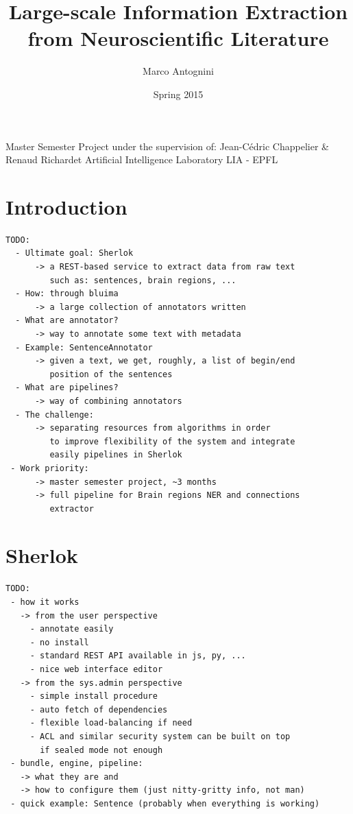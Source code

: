 \documentclass{article}
\title{Large-scale Information Extraction from Neuroscientific Literature}
\date{Spring 2015}
\author{Marco Antognini}
\begin{document}
\maketitle

Master Semester Project under the supervision of:
Jean-Cédric Chappelier \&
Renaud Richardet
Artificial Intelligence Laboratory LIA - EPFL

\newpage
{}


\tableofcontents
\newpage

\section{Introduction}

\begin{verbatim}
TODO:
  - Ultimate goal: Sherlok
      -> a REST-based service to extract data from raw text
         such as: sentences, brain regions, ...
  - How: through bluima
      -> a large collection of annotators written
  - What are annotator?
      -> way to annotate some text with metadata
  - Example: SentenceAnnotator
      -> given a text, we get, roughly, a list of begin/end
         position of the sentences
  - What are pipelines?
      -> way of combining annotators
  - The challenge:
      -> separating resources from algorithms in order
         to improve flexibility of the system and integrate
         easily pipelines in Sherlok
 - Work priority:
      -> master semester project, ~3 months
      -> full pipeline for Brain regions NER and connections
         extractor
\end{verbatim}

\section{Sherlok}

\begin{verbatim}
TODO:
 - how it works
   -> from the user perspective
     - annotate easily
     - no install
     - standard REST API available in js, py, ...
     - nice web interface editor
   -> from the sys.admin perspective
     - simple install procedure
     - auto fetch of dependencies
     - flexible load-balancing if need
     - ACL and similar security system can be built on top
       if sealed mode not enough
 - bundle, engine, pipeline:
   -> what they are and
   -> how to configure them (just nitty-gritty info, not man)
 - quick example: Sentence (probably when everything is working)
\end{verbatim}
\end{document}
